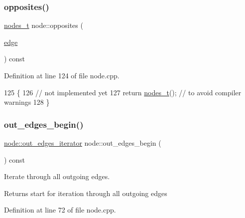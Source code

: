 \subsubsection{\texorpdfstring{opposites()}{opposites()}}
{\footnotesize\ttfamily \mbox{\hyperlink{edge_8h_a22ac17689106ba21a84e7bc54d1199d6}{nodes\+\_\+t}} node\+::opposites (\begin{DoxyParamCaption}\item[{\mbox{\hyperlink{classedge}{edge}}}]{ }\end{DoxyParamCaption}) const}



Definition at line 124 of file node.\+cpp.


\begin{DoxyCode}
125 \{
126     \textcolor{comment}{// not implemented yet}
127     \textcolor{keywordflow}{return} \mbox{\hyperlink{edge_8h_a22ac17689106ba21a84e7bc54d1199d6}{nodes\_t}}(); \textcolor{comment}{// to avoid compiler warnings}
128 \}
\end{DoxyCode}
\mbox{\label{classnode_a7dcb80df22118cea04f77ca8c952d9c2}} 
\subsubsection{\texorpdfstring{out\+\_\+edges\+\_\+begin()}{out\_edges\_begin()}}
{\footnotesize\ttfamily \mbox{\hyperlink{classnode_a90e17ed34de55072e8077f4367499a98}{node\+::out\+\_\+edges\+\_\+iterator}} node\+::out\+\_\+edges\+\_\+begin (\begin{DoxyParamCaption}{ }\end{DoxyParamCaption}) const}

Iterate through all outgoing edges.

\begin{DoxyReturn}{Returns}
start for iteration through all outgoing edges 
\end{DoxyReturn}


Definition at line 72 of file node.\+cpp.


